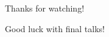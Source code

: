 \begin{frame}{Thanks for watching!}

  \par Good luck with final talks!

  \nocite{*}
  \printbibliography

\end{frame}
